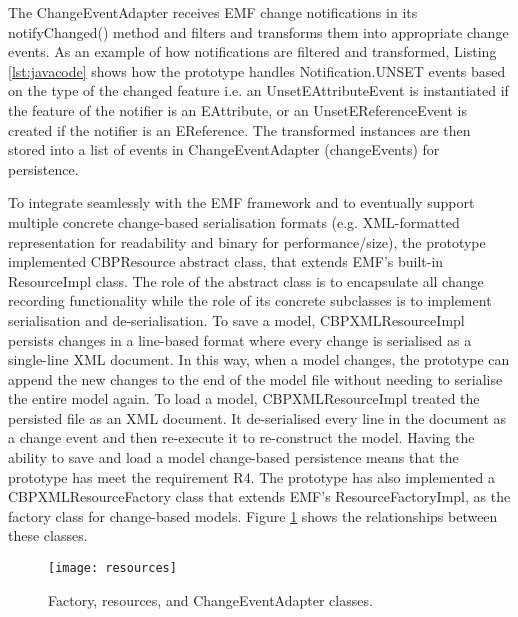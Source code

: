 The \textsf{ChangeEventAdapter} receives EMF change notifications in its \textsf{notifyChanged()} method and filters and transforms them into appropriate change events. As an example of how notifications are filtered and transformed, Listing \ref{lst:javacode} shows how the prototype handles \textsf{Notification.UNSET} events based on the type of the changed feature i.e. an \textsf{UnsetEAttributeEvent} is instantiated if the feature of the notifier is an \textsf{EAttribute}, or an \textsf{UnsetEReferenceEvent}  is created if the notifier is an \textsf{EReference}. The transformed instances are then stored into a list of events in \textsf{ChangeEventAdapter} (\textsf{changeEvents}) for persistence. 

To integrate seamlessly with the EMF framework and to eventually support multiple concrete change-based serialisation formats (e.g. XML-formatted representation for readability and binary for performance/size), the prototype implemented \textsf{CBPResource} abstract class, that extends EMF's built-in \textsf{ResourceImpl} class. The role of the abstract class is to encapsulate all change recording functionality while the role of its concrete subclasses is to implement serialisation and de-serialisation. To save a model, \textsf{CBPXMLResourceImpl} persists changes in a line-based format where every change is serialised as a single-line XML document. In this way, when a model changes, the prototype can append the new changes to the end of the model file without needing to serialise the entire model again. To load a model, \textsf{CBPXMLResourceImpl} treated the persisted file as an XML document. It de-serialised every line in the document as a change event and then re-execute it to re-construct the model. Having the ability to save and load a model change-based persistence means that the prototype has meet the requirement R4.  The prototype has also implemented a \textsf{CBPXMLResourceFactory} class that extends EMF's \textsf{ResourceFactoryImpl}, as the factory class for change-based models. Figure \ref{fig:resources} shows the relationships between these classes.

\begin{figure}[th]
    \centering
    \texttt{[image: resources]}
    \caption{Factory, resources, and ChangeEventAdapter classes.}
    \label{fig:resources}
\end{figure}

